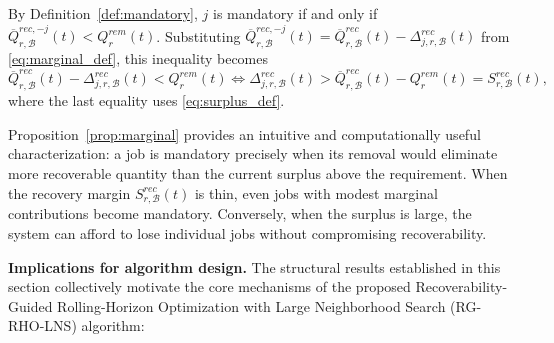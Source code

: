\begin{pf}
By Definition~\ref{def:mandatory}, $j$ is mandatory if and only if $\overline Q_{r,\mathcal B}^{rec,-j}(t)<Q_r^{rem}(t)$. Substituting $\overline Q_{r,\mathcal B}^{rec,-j}(t)=\overline Q_{r,\mathcal B}^{rec}(t)-\Delta_{j,r,\mathcal B}^{rec}(t)$ from \eqref{eq:marginal_def}, this inequality becomes
\[
\overline Q_{r,\mathcal B}^{rec}(t)-\Delta_{j,r,\mathcal B}^{rec}(t)<Q_r^{rem}(t)
\iff\Delta_{j,r,\mathcal B}^{rec}(t)>\overline Q_{r,\mathcal B}^{rec}(t)-Q_r^{rem}(t)=S_{r,\mathcal B}^{rec}(t),
\]
where the last equality uses \eqref{eq:surplus_def}.
\end{pf}

Proposition~\ref{prop:marginal} provides an intuitive and computationally useful characterization: a job is mandatory precisely when its removal would eliminate more recoverable quantity than the current surplus above the requirement. When the recovery margin $S_{r,\mathcal B}^{rec}(t)$ is thin, even jobs with modest marginal contributions become mandatory. Conversely, when the surplus is large, the system can afford to lose individual jobs without compromising recoverability.

\medskip\noindent\textbf{Implications for algorithm design.}
The structural results established in this section collectively motivate the core mechanisms of the proposed Recoverability-Guided Rolling-Horizon Optimization with Large Neighborhood Search (RG-RHO-LNS) algorithm:

